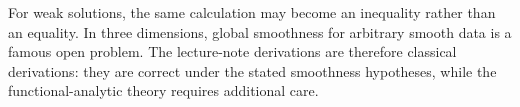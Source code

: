 For weak solutions, the same calculation may become an inequality rather than
an equality.  In three dimensions, global smoothness for arbitrary smooth data
is a famous open problem.  The lecture-note derivations are therefore
classical derivations: they are correct under the stated smoothness
hypotheses, while the functional-analytic theory requires additional care.
